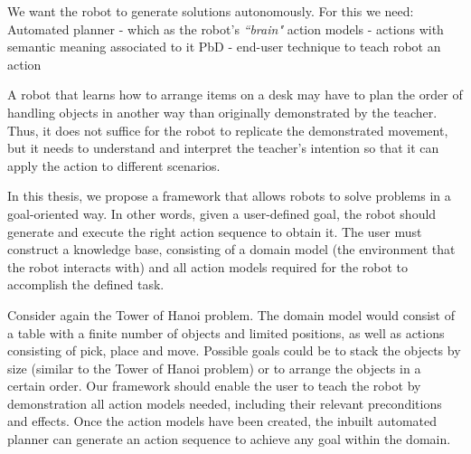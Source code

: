 We want the robot to generate solutions autonomously.
For this we need:
Automated planner - which as the robot's \textit{``brain"}
action models - actions with semantic meaning associated to it
PbD - end-user technique to teach robot an action

A robot that learns how to arrange items on a desk may have to plan the order of handling objects in another way than originally demonstrated by the teacher.
Thus, it does not suffice for the robot to replicate the demonstrated movement, but it needs to understand and interpret the teacher's intention so that it can apply the action to different scenarios.


In this thesis, we propose a framework that allows robots to solve problems in a goal-oriented way.
In other words, given a user-defined goal, the robot should generate and execute the right action sequence to obtain it.
The user must construct a knowledge base, consisting of a domain model (the environment that the robot interacts with) and all action models required for the robot to accomplish the defined task.

Consider again the Tower of Hanoi problem.
The domain model would consist of a table with a finite number of objects and limited positions, as well as actions consisting of pick, place and move. 
Possible goals could be to stack the objects by size (similar to the Tower of Hanoi problem) or to arrange the objects in a certain order. 
Our framework should enable the user to teach the robot by demonstration all action models needed, including their relevant preconditions and effects. 
Once the action models have been created, the inbuilt automated planner can generate an action sequence to achieve any goal within the domain. 


